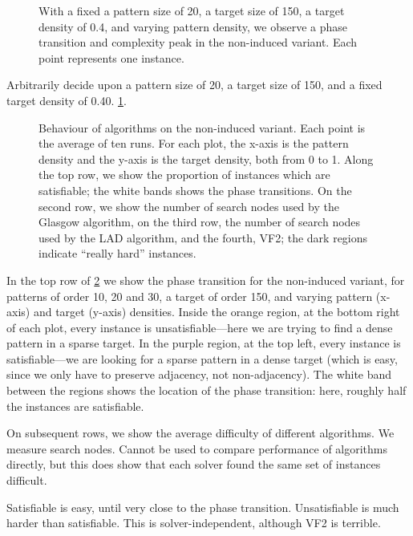 \documentclass[letterpaper]{article}
\begin{document}
\begin{figure}[tb]
    
    \caption{With a fixed a pattern size of 20, a target size of 150, a target density of 0.4, and
    varying pattern density, we observe a phase transition and complexity peak in the non-induced
    variant. Each point represents one instance.}
    \label{figure:phase-transition}
\end{figure}

Arbitrarily decide upon a pattern size of 20, a target size of 150, and a fixed target density of
0.40. \cref{figure:phase-transition}.

\begin{figure}[tb]
    \hskip-0.2cm
    \setlength{\abovecaptionskip}{-2.5em}
    \caption{Behaviour of algorithms on the non-induced variant. Each point is the average of ten
        runs. For each plot, the x-axis is the pattern density and the y-axis is the target
        density, both from 0 to 1. Along the top row, we show the proportion of instances which are
        satisfiable; the white bands shows the phase transitions. On the second row, we show the
        number of search nodes used by the Glasgow algorithm, on the third row, the number of
        search nodes used by the LAD algorithm, and the fourth, VF2; the dark regions indicate
        ``really hard'' instances.}
    \label{figure:non-induced}
\end{figure}

In the top row of \cref{figure:non-induced} we show the phase transition for the non-induced
variant, for patterns of order 10, 20 and 30, a target of order 150, and varying pattern (x-axis)
and target (y-axis) densities. Inside the orange region, at the bottom right of each plot, every
instance is unsatisfiable---here we are trying to find a dense pattern in a sparse target. In the
purple region, at the top left, every instance is satisfiable---we are looking for a sparse pattern
in a dense target (which is easy, since we only have to preserve adjacency, not non-adjacency). The
white band between the regions shows the location of the phase transition: here, roughly half the
instances are satisfiable.

On subsequent rows, we show the average difficulty of different algorithms.  We measure search
nodes. Cannot be used to compare performance of algorithms directly, but this does show that each
solver found the same set of instances difficult.

Satisfiable is easy, until very close to the phase transition. Unsatisfiable is much harder than
satisfiable. This is solver-independent, although VF2 is terrible.
\end{document}

